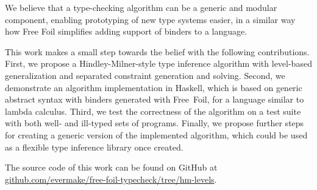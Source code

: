 We believe that a type-checking algorithm can be a generic and modular component, enabling prototyping of new type systems easier, in a similar way how Free Foil simplifies adding support of binders to a language.

This work makes a small step towards the belief with the following contributions. First, we propose a Hindley-Milner-style type inference algorithm with level-based generalization and separated constraint generation and solving. Second, we demonstrate an algorithm implementation in Haskell, which is based on generic abstract syntax with binders generated with Free~Foil, for a language similar to lambda calculus. Third, we test the correctness of the algorithm on a test suite with both well- and ill-typed sets of programs. Finally, we propose further steps for creating a generic version of the implemented algorithm, which could be used as a flexible type inference library once created.

The source code of this work can be found on GitHub at \href{https://github.com/evermake/free-foil-typecheck/tree/hm-levels}{github.com/evermake/free-foil-typecheck/tree/hm-levels}.
